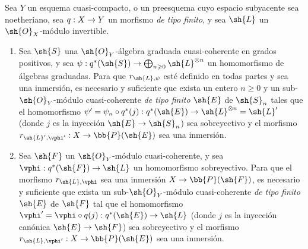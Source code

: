 \documentclass[oneside,10pt]{amsart}
\makeatletter
\renewcommand{\geq}{\geqslant}
\newcommand{\ega@arrow}[2]{\mathchoice{#1}{#2}{#2}{#2}}
\renewcommand{\to}{\ega@arrow{\longrightarrow}{\rightarrow}}
\newcommand{\oldpage}[2][]{\marginnote{\normalfont\footnotesize\textbf{#1}~|~#2}\ignorespaces}
\let\EGAOriginalLabel\label
\renewcommand{\label}[1]{\phantomsection\EGAOriginalLabel{#1}}
\makeatother
\begin{document}
\begin{proposition}[4.4.1]
\label{II.4.4.1}
Sea $Y$ un esquema cuasi-compacto, o un preesquema cuyo espacio subyacente sea noetheriano, sea $q:X\to Y$ un morfismo \emph{de tipo finito}, y sea $\sh{L}$ un $\sh{O}_X$-módulo invertible.
\begin{enumerate}
  \item[\rm{(i)}] Sea $\sh{S}$ una $\sh{O}_Y$-álgebra graduada cuasi-coherente en grados positivos, y sea $\psi:q^*(\sh{S})\to\bigoplus_{n\geq0}\sh{L}^{\otimes n}$ un homomorfismo de álgebras graduadas.
    Para que $r_{\sh{L},\psi}$ esté definido en todas partes y sea una inmersión, es necesario y
\oldpage[II]{79}
    suficiente que exista un entero $n\geq0$ y un sub-$\sh{O}_Y$-módulo cuasi-coherente \emph{de tipo finito} $\sh{E}$ de $\sh{S}_n$ tales que el homomorfismo $\psi'=\psi_n\circ q^*(j):q^*(\sh{E})\to\sh{L}^{\otimes n}=\sh{L}'$ (donde $j$ es la inyección $\sh{E}\to\sh{S}_n$) sea sobreyectivo y el morfismo $r_{\sh{L}',\vphi'}:X\to\bb{P}(\sh{E})$ sea una inmersión.
  \item[\rm{(ii)}] Sea $\sh{F}$ un $\sh{O}_Y$-módulo cuasi-coherente, y sea $\vphi:q^*(\sh{F})\to\sh{L}$ un homomorfismo sobreyectivo.
    Para que el morfismo $r_{\sh{L},\vphi}$ sea una inmersión $X\to\bb{P}(\sh{F})$, es necesario y suficiente que exista un sub-$\sh{O}_Y$-módulo cuasi-coherente \emph{de tipo finito} $\sh{E}$ de $\sh{F}$ tal que el homomorfismo $\vphi'=\vphi\circ q(j):q^*(\sh{E})\to\sh{L}$ (donde $j$ es la inyección canónica $\sh{E}\to\sh{F}$) sea sobreyectivo y el morfismo $r_{\sh{L},\vphi'}:X\to\bb{P}(\sh{E})$ sea una inmersión.
\end{enumerate}
\end{proposition}
\end{document}
